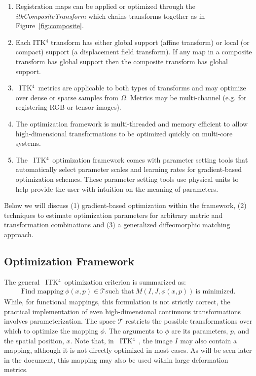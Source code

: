 \documentclass{frontiersSCNS}
\newcommand{\tk}{~ITK$^{\text{4}}$~}
\begin{document}
\begin{enumerate}
\item Registration maps can be applied or optimized through the {\em
    itkCompositeTransform} which chains transforms together as in Figure~\ref{fig:composite}.
\item Each ITK$^4$ transform has either global support (affine
  transform) or local (or compact) support (a displacement field transform).   If
  any map in a composite transform has global support then the
  composite transform has global support. 
\item \tk metrics are applicable to both types of transforms and may
  optimize over dense or sparse samples from $\Omega$.  Metrics may be
  multi-channel (e.g. for registering RGB or tensor images).
\item The optimization framework is multi-threaded and memory
  efficient to allow high-dimensional transformations to be optimized
  quickly on multi-core systems.
\item The \tk optimization framework comes with parameter setting tools
  that automatically select parameter scales and learning rates for
  gradient-based optimization schemes.  These parameter setting tools
  use physical units to help provide the user with intuition on the
  meaning of parameters.  
\end{enumerate}
Below we will discuss (1) gradient-based optimization within the
framework, (2) techniques to estimate optimization parameters for
arbitrary metric and transformation combinations and (3) a generalized
diffeomorphic matching approach.  

\subsection{Optimization Framework}
The general \tk optimization criterion is summarized as:
\begin{eqnarray}
\text{Find mapping}~\phi(x,p) \in \mathcal{T}
\text{such that}~M(I,J,\phi(x,p))~\text{is minimized}. 
\label{eq:gen}
\end{eqnarray}
While, for functional mappings, this formulation is not strictly correct, the
practical implementation of even high-dimensional continuous
transformations involves parameterization. 
The space $\mathcal{T}$ restricts the possible transformations over
which to optimize the mapping $\phi$.  The arguments to $\phi$ are its
parameters, $p$, and the spatial position, $x$.  Note that, in \tk,
the image $I$ may also contain a mapping, although it is not directly
optimized in most cases.  As will be seen later in the document, this
mapping may also be used within large deformation metrics. 
\end{document}
